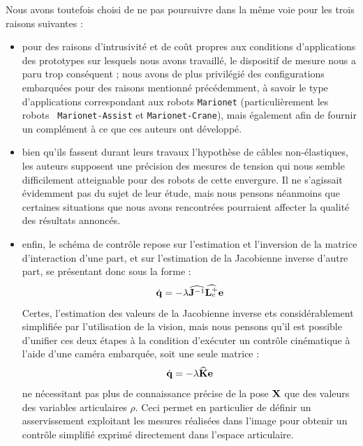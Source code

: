 Nous avons toutefois choisi de ne pas poursuivre dans la m\^eme voie pour
les trois raisons suivantes :
\begin{itemize}
 \item pour des raisons d'intrusivit\'e et de co\^ut propres aux conditions
d'applica\-tions des prototypes sur lesquels nous avons travaill\'e, le
dispositif de mesure nous a paru trop cons\'equent ; nous avons
de plus privil\'egi\'e des configurations embarqu\'ees pour des 
raisons mentionn\'e pr\'ec\'edemment, \`a savoir le type d'applications 
correspondant aux robots {\tt Marionet} (particuli\`erement les robots {\tt 
Marionet-Assist} et {\tt Marionet-Crane}), mais \'egale\-ment afin de fournir 
un compl\'ement \`a ce que ces auteurs ont d\'evelopp\'e.
\item bien qu'ils fassent durant leurs travaux l'hypoth\`ese de c\^ables
non-\'elastiques, les auteurs supposent une pr\'ecision des mesures de tension
qui nous semble difficilement atteignable pour des robots de cette envergure. Il
ne s'agissait \'evidemment pas du sujet de leur \'etude, mais nous pensons
n\'eanmoins que certaines situations que nous avons rencontr\'ees pourraient
affecter la qualit\'e des r\'esultats annonc\'es. 
\item enfin, le sch\'ema de contr\^ole repose sur l'estimation et l'inversion
de la matrice d'interaction d'une part, et sur l'estimation de la Jacobienne
inverse d'autre part, se pr\'esentant donc sous la forme :
\begin{equation}
\dot {\bf q} = - \lambda \widehat {{\bf J}^{-1}} \widehat{ {\bf L}_e^+} {\bf e} 
\label{intro:eq25}
\end{equation}
Certes, l'estimation des valeurs de la Jacobienne inverse ets 
consid\'erablement simplifi\'ee par l'utilisation de la vision, mais nous 
pensons qu'il est possible d'unifier ces deux \'etapes \`a la condition
d'ex\'ecuter un contr\^ole cin\'ematique \`a l'aide d'une cam\'era embarqu\'ee,
soit une seule matrice :
\begin{equation}
\dot {\bf q} = - \lambda \widehat {\bf K} {\bf e} 
\label{intro:eq26}
\end{equation}
ne n\'ecessitant pas plus de connaissance pr\'ecise de la pose ${\bf X}$ que des
valeurs des variables articulaires $\rho$. Ceci permet en particulier de 
d\'efinir un asservissement exploitant les mesures r\'ealis\'ees dans l'image 
pour obtenir un contr\^ole simplifi\'e exprim\'e directement dans l'espace 
articulaire.
\end{itemize}

